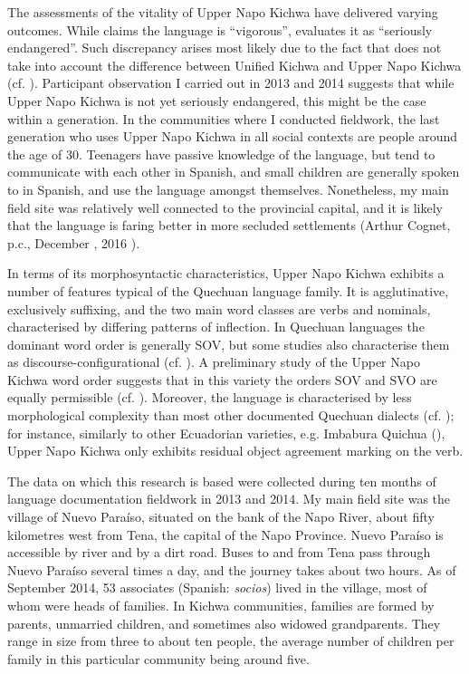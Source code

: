 \documentclass[output=paper]{langscibook}
\begin{document}
The assessments of the vitality of Upper Napo Kichwa have delivered varying outcomes. While \cite{Ethnologue2016} claims the language is “vigorous”, \cite{Moseley2010} evaluates it as “seriously endangered”. Such discrepancy arises most likely due to the fact that \cite{Ethnologue2016} does not take into account the difference between Unified Kichwa and Upper Napo Kichwa (cf. \citealt{Grzech2017}). Participant observation I carried out in 2013 and 2014 suggests that while Upper Napo Kichwa is not yet seriously endangered, this might be the case within a generation. In the communities where I conducted fieldwork, the last generation who uses Upper Napo Kichwa in all social contexts are people around the age of 30. Teenagers have passive knowledge of the language, but tend to communicate with each other in Spanish, and small children are generally spoken to in Spanish, and use the language amongst themselves. Nonetheless, my main field site was relatively well connected to the provincial capital, and it is likely that the language is faring better in more secluded settlements (Arthur Cognet, p.c., December , 2016 ).

In terms of its morphosyntactic characteristics, Upper Napo Kichwa exhibits a number of features typical of the Quechuan language family. It is agglutinative, exclusively suffixing, and the two main word classes are verbs and nominals, characterised by differing patterns of inflection. In Quechuan languages the dominant word order is generally SOV, but some studies also characterise them as discourse-configurational (cf. \citealt{Muysken1995}). A preliminary study of the Upper Napo Kichwa word order suggests that in this variety the orders SOV and SVO are equally permissible (cf. \citealt[ch.4]{Grzech2016a}). Moreover, the language is characterised by less morphological complexity than most other documented Quechuan dialects (cf. \citealt{Adelaar2004}); for instance, similarly to other Ecuadorian varieties, e.g. Imbabura Quichua (\citealt{Cole1982}), Upper Napo Kichwa only exhibits residual object agreement marking on the verb.

The data on which this research is based were collected during ten months of language documentation fieldwork in 2013 and 2014. My main field site was the village of Nuevo Paraíso, situated on the bank of the Napo River, about fifty kilometres west from Tena, the capital of the Napo Province. Nuevo Paraíso is accessible by river and by a dirt road. Buses to and from Tena pass through Nuevo Paraíso several times a day, and the journey takes about two hours. As of September 2014, 53 associates (Spanish: \textit{socios}) lived in the village, most of whom were heads of families. In Kichwa communities, families are formed by parents, unmarried children, and sometimes also widowed grandparents. They range in size from three to about ten people, the average number of children per family in this particular community being around five.
\end{document}
